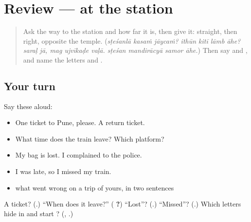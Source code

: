 \section[(review)]{Review — at the station}

\label{lesson:MR-R283-at-the-station}



\begin{quote}
Ask the way to the station and how far it is, then give it: straight, then right, opposite the temple. (\emph{sṭeśanlā kasaṁ jāycaṁ? ithūn kitī lāmb āhe?} \emph{saraḷ jā, mag ujvīkaḍe vaḷā. sṭeśan mandirācyā samor āhe.}) Then say \textbf{} and \textbf{}, and name the letters \textbf{} and \textbf{}.
\end{quote}

\subsection*{Your turn}
Say these aloud:

\begin{itemize}
\raggedright
  \item One ticket to Pune, please. A return ticket.
  \item What time does the train leave? Which platform?
  \item My bag is lost. I complained to the police.
  \item I was late, so I missed my train.
  \item what went wrong on a trip of yours, in two sentences
\end{itemize}

\begin{tcolorbox}[breakable,colback=teal!4,colframe=teal!35!black,title={Before you move on}]
A ticket? (\textbf{}.) \textquotedblleft{}When does it leave?\textquotedblright{} (\textbf{  ?}) \textquotedblleft{}Lost\textquotedblright{}? (\textbf{}.) \textquotedblleft{}Missed\textquotedblright{}? (\textbf{}.) Which letters hide in \textbf{} and start \textbf{}? (\textbf{}, \textbf{}.)
\end{tcolorbox}
